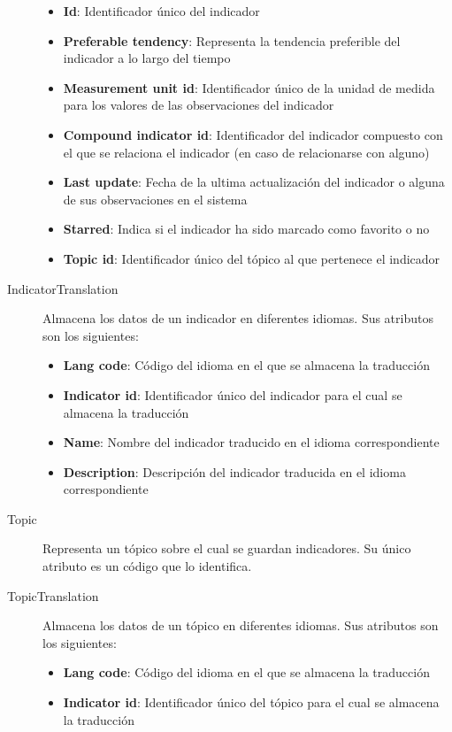 \begin{description}
		\begin{itemize}
			\item \textbf{Id}:  Identificador único del indicador
			\item \textbf{Preferable tendency}:  Representa la tendencia preferible del indicador a lo largo del tiempo
			\item \textbf{Measurement unit id}:  Identificador único de la unidad de medida para los valores de las observaciones del indicador
			\item \textbf{Compound indicator id}:  Identificador del indicador compuesto con el que se relaciona el indicador (en caso de relacionarse con alguno)
			\item \textbf{Last update}:  Fecha de la ultima actualización del indicador o alguna de sus observaciones en el sistema
			\item \textbf{Starred}:  Indica si el indicador ha sido marcado como favorito o no
			\item \textbf{Topic id}:  Identificador único del tópico al que pertenece el indicador
		\end{itemize}
	\item[IndicatorTranslation]  Almacena los datos de un indicador en diferentes idiomas.  Sus atributos son los siguientes:
		\begin{itemize}
			\item \textbf{Lang code}:  Código del idioma en el que se almacena la traducción
			\item \textbf{Indicator id}:  Identificador único del indicador para el cual se almacena la traducción
			\item \textbf{Name}:  Nombre del indicador traducido en el idioma correspondiente
			\item \textbf{Description}:  Descripción del indicador traducida en el idioma correspondiente
		\end{itemize}
	\item[Topic]  Representa un tópico sobre el cual se guardan indicadores.  Su único atributo es un código que lo identifica.
	\item[TopicTranslation]  Almacena los datos de un tópico en diferentes idiomas.  Sus atributos son los siguientes:
		\begin{itemize}
			\item \textbf{Lang code}:  Código del idioma en el que se almacena la traducción
			\item \textbf{Indicator id}:  Identificador único del tópico para el cual se almacena la traducción

\end{itemize}
\end{description}
